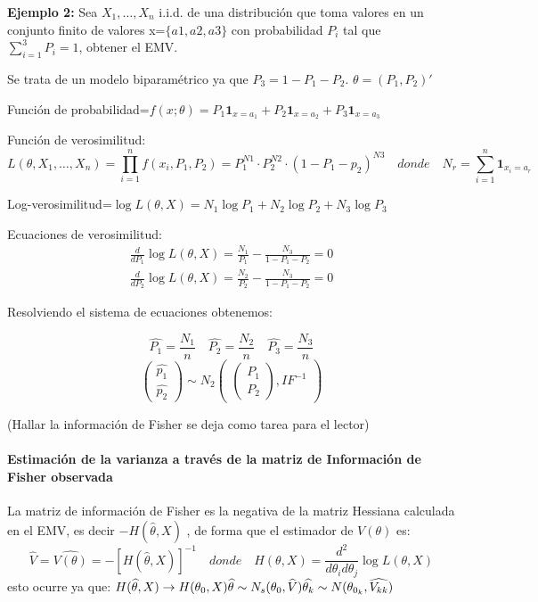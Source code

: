 \textbf{Ejemplo 2:}
Sea $X_1,\dots,X_n$ i.i.d. de una distribución que toma valores en un conjunto finito de valores x=$\{a1,a2,a3\}$ con probabilidad
$P_i$ tal que $\sum_{i=1}^{3} P_i=1$, obtener el EMV.

Se trata de un modelo biparamétrico ya que $P_3=1-P_1-P_2$. $\theta=(P_1,P_2)'$

Función de probabilidad=$f(x; \theta) = P_1 \mathbf{1}_{x = a_1} + P_2 \mathbf{1}_{x = a_2} + P_3 \mathbf{1}_{x = a_3}$

Función de verosimilitud:
\[L(\theta,X_1,\dots,X_n)=\prod_{i=1}^{n}f(x_i,P_1,P_2)=P_1^{N1}\cdot P_2^{N2} \cdot (1-P_1-p_2)^{N3}
\quad donde \quad N_r=\sum_{i=1}^{n} \mathbf{1}_{x_i=a_r}
\]

Log-verosimilitud=$ \log L(\theta,X)=N_1 \log P_1 + N_2 \log P_2 +N_3 \log P_3$

Ecuaciones de verosimilitud:
\[
\begin{matrix}
    \frac{d}{dP_1} \log L(\theta,X)=\frac{N_1}{P_1}-\frac{N_3}{1-P_1-P_2}=0
    \\ \frac{d}{dP_2} \log L(\theta,X)=\frac{N_2}{P_2}-\frac{N_3}{1-P_1-P_2}=0
    
\end{matrix}
\]

Resolviendo el sistema de ecuaciones obtenemos:

\[
\widehat{P_1}=\frac{N_1}{n} \quad \widehat{P_2}=\frac{N_2}{n} \quad \widehat{P_3}=\frac{N_3}{n}
\]
\[
\begin{pmatrix}
    \widehat{p_1} \\
    \widehat{p_2}
\end{pmatrix}
\sim
N_2
\begin{pmatrix}
    \begin{pmatrix}
        P_1 \\
        P_2
    \end{pmatrix}
, IF^{-1}
\end{pmatrix}
\]

(Hallar la información de Fisher se deja como tarea para el lector)

\paragraph{Estimación de la varianza a través de la matriz de Información de Fisher observada}

La matriz de información de Fisher es la negativa de la matriz Hessiana calculada en el EMV, es decir $-H(\widehat{\theta},X)$
, de forma que el estimador de $V(\theta)$ es:
\[
\widehat{V}=\widehat{V(\theta)}=-[H(\widehat{\theta},X)]^{-1} \quad donde\quad H(\theta,X)=\frac{d^2}{d \theta_i d \theta_j} \log L(\theta,X)
\]
esto ocurre ya que:
\(
H(\widehat{\theta},X) \to H(\theta_0,X)
\\ \widehat{\theta} \sim N_s(\theta_0,\widehat{V})
\widehat{\theta_k} \sim N(\theta_{0_k},\widehat{V_{kk}})
\)

